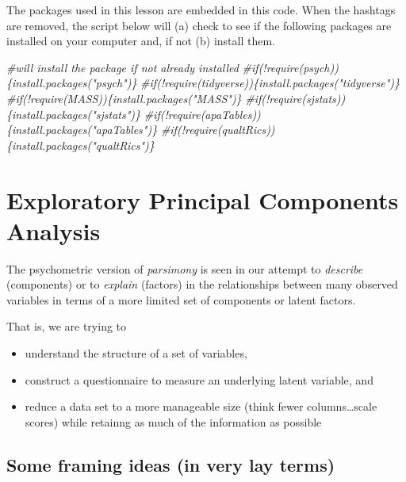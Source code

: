 \documentclass[
  english,
]{book}
\newenvironment{Shaded}{\begin{snugshade}}{\end{snugshade}}
\newcommand{\CommentTok}[1]{\textcolor[rgb]{0.56,0.35,0.01}{\textit{#1}}}
\providecommand{\tightlist}{%
  \setlength{\itemsep}{0pt}\setlength{\parskip}{0pt}}
\begin{document}
The packages used in this lesson are embedded in this code. When the hashtags are removed, the script below will (a) check to see if the following packages are installed on your computer and, if not (b) install them.

\begin{Shaded}
\begin{Highlighting}[]
\CommentTok{#will install the package if not already installed}
\CommentTok{#if(!require(psych))\{install.packages("psych")\}}
\CommentTok{#if(!require(tidyverse))\{install.packages("tidyverse")\}}
\CommentTok{#if(!require(MASS))\{install.packages("MASS")\}}
\CommentTok{#if(!require(sjstats))\{install.packages("sjstats")\}}
\CommentTok{#if(!require(apaTables))\{install.packages("apaTables")\}}
\CommentTok{#if(!require(qualtRics))\{install.packages("qualtRics")\}}
\end{Highlighting}
\end{Shaded}

\hypertarget{exploratory-principal-components-analysis}{%
\section{Exploratory Principal Components Analysis}\label{exploratory-principal-components-analysis}}

The psychometric version of \emph{parsimony} is seen in our attempt to \emph{describe} (components) or to \emph{explain} (factors) in the relationships between many observed variables in terms of a more limited set of components or latent factors.

That is, we are trying to

\begin{itemize}
\tightlist
\item
  understand the structure of a set of variables,
\item
  construct a questionnaire to measure an underlying latent variable, and
\item
  reduce a data set to a more manageable size (think fewer columns\ldots scale scores) while retainng as much of the information as possible
\end{itemize}

\hypertarget{some-framing-ideas-in-very-lay-terms}{%
\subsection{Some framing ideas (in very lay terms)}\label{some-framing-ideas-in-very-lay-terms}}
\end{document}
